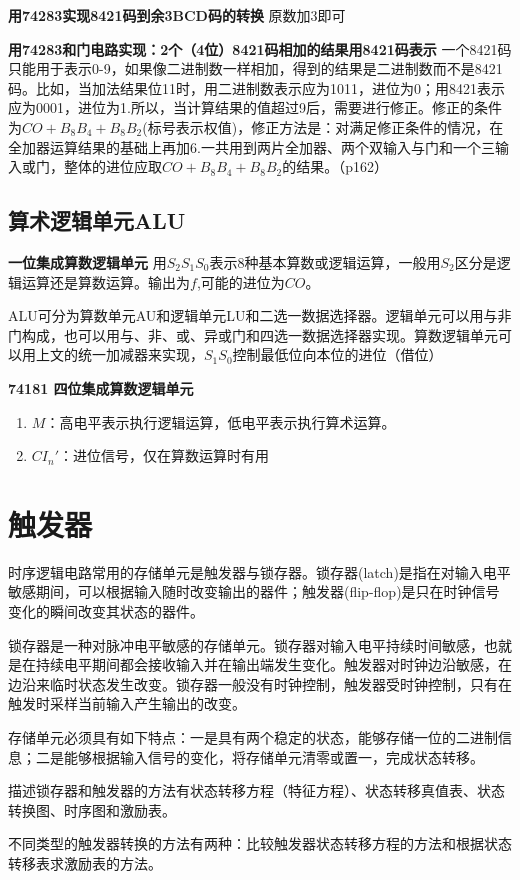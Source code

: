 \documentclass{ctexart}
\newcommand*{\noindbf}[1]{{\noindent \bf{#1} \qquad}}
\begin{document}
\noindbf{用74283实现8421码到余3BCD码的转换}原数加3即可

\noindbf{用74283和门电路实现：2个（4位）8421码相加的结果用8421码表示}一个8421码只能用于表示0-9，如果像二进制数一样相加，得到的结果是二进制数而不是8421码。比如，当加法结果位11时，用二进制数表示应为1011，进位为0；用8421表示应为0001，进位为1.所以，当计算结果的值超过9后，需要进行修正。修正的条件为$CO+B_8B_4+B_8B_2$(标号表示权值)，修正方法是：对满足修正条件的情况，在全加器运算结果的基础上再加6.一共用到两片全加器、两个双输入与门和一个三输入或门，整体的进位应取$CO+B_8B_4+B_8B_2$的结果。（p162）
\subsection{算术逻辑单元ALU}
\noindbf{一位集成算数逻辑单元}
用$S_2S_1S_0$表示8种基本算数或逻辑运算，一般用$S_2$区分是逻辑运算还是算数运算。输出为$f$,可能的进位为$CO$。

ALU可分为算数单元AU和逻辑单元LU和二选一数据选择器。逻辑单元可以用与非门构成，也可以用与、非、或、异或门和四选一数据选择器实现。算数逻辑单元可以用上文的统一加减器来实现，$S_1S_0$控制最低位向本位的进位（借位）

\noindbf{74181 四位集成算数逻辑单元}
\begin{enumerate}
    \item $M$：高电平表示执行逻辑运算，低电平表示执行算术运算。
    \item $CI_n'$：进位信号，仅在算数运算时有用
\end{enumerate}
\section{触发器}
时序逻辑电路常用的存储单元是触发器与锁存器。锁存器(latch)是指在对输入电平敏感期间，可以根据输入随时改变输出的器件；触发器(flip-flop)是只在时钟信号变化的瞬间改变其状态的器件。

锁存器是一种对脉冲电平敏感的存储单元。锁存器对输入电平持续时间敏感，也就是在持续电平期间都会接收输入并在输出端发生变化。触发器对时钟边沿敏感，在边沿来临时状态发生改变。锁存器一般没有时钟控制，触发器受时钟控制，只有在触发时采样当前输入产生输出的改变。

存储单元必须具有如下特点：一是具有两个稳定的状态，能够存储一位的二进制信息；二是能够根据输入信号的变化，将存储单元清零或置一，完成状态转移。

描述锁存器和触发器的方法有状态转移方程（特征方程）、状态转移真值表、状态转换图、时序图和激励表。

不同类型的触发器转换的方法有两种：比较触发器状态转移方程的方法和根据状态转移表求激励表的方法。
\end{document}
